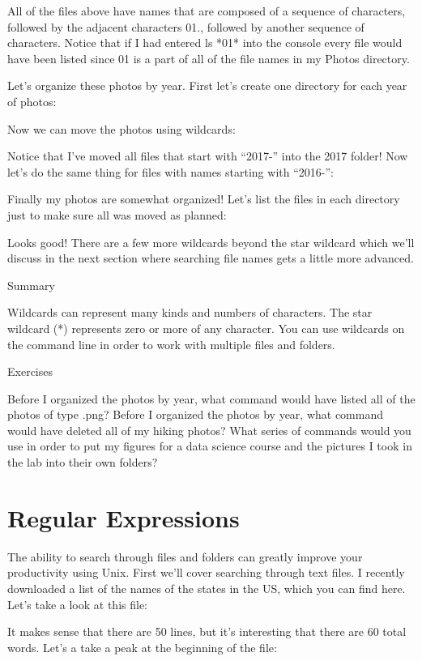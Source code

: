 All of the files above have names that are composed of a sequence of characters, followed by the adjacent characters 01., followed by another sequence of characters. Notice that if I had entered ls *01* into the console every file would have been listed since 01 is a part of all of the file names in my Photos directory.

Let’s organize these photos by year. First let’s create one directory for each year of photos:

Now we can move the photos using wildcards:

Notice that I’ve moved all files that start with “2017-” into the 2017 folder! Now let’s do the same thing for files with names starting with “2016-”:

Finally my photos are somewhat organized! Let’s list the files in each directory just to make sure all was moved as planned:

Looks good! There are a few more wildcards beyond the star wildcard which we’ll discuss in the next section where searching file names gets a little more advanced.


Summary

Wildcards can represent many kinds and numbers of characters.
The star wildcard (*) represents zero or more of any character.
You can use wildcards on the command line in order to work with multiple files and folders.

Exercises

    Before I organized the photos by year, what command would have listed all of the photos of type .png?
Before I organized the photos by year, what command would have deleted all of my hiking photos?
What series of commands would you use in order to put my figures for a data science course and the pictures I took in the lab into their own folders?


\section{Regular Expressions}

The ability to search through files and folders can greatly improve your productivity using Unix. First we’ll cover searching through text files. I recently downloaded a list of the names of the states in the US, which you can find here. Let’s take a look at this file:

It makes sense that there are 50 lines, but it’s interesting that there are 60 total words. Let’s a take a peak at the beginning of the file:

